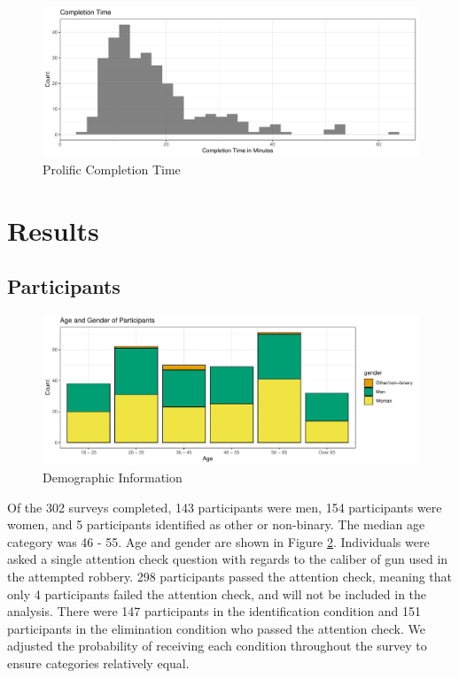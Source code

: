 \documentclass[print]{nuthesis}
\begin{document}
\begin{figure}

{\centering \includegraphics[width=\linewidth]{thesis_files/figure-latex/completiontime2-1} 

}

\caption{Prolific Completion Time}\label{fig:completiontime2}
\end{figure}

\hypertarget{results-1}{%
\section{Results}\label{results-1}}

\hypertarget{participants-1}{%
\subsection{Participants}\label{participants-1}}

\begin{figure}

{\centering \includegraphics[width=\linewidth]{thesis_files/figure-latex/demographics2-1} 

}

\caption{Demographic Information}\label{fig:demographics2}
\end{figure}

Of the 302 surveys completed, 143 participants were men, 154 participants were women, and 5 participants identified as other or non-binary.
The median age category was 46 - 55.
Age and gender are shown in Figure \ref{fig:demographics2}.
Individuals were asked a single attention check question with regards to the caliber of gun used in the attempted robbery.
298 participants passed the attention check, meaning that only 4 participants failed the attention check, and will not be included in the analysis.
There were 147 participants in the identification condition and 151 participants in the elimination condition who passed the attention check.
We adjusted the probability of receiving each condition throughout the survey to ensure  categories  relatively equal.
\end{document}

